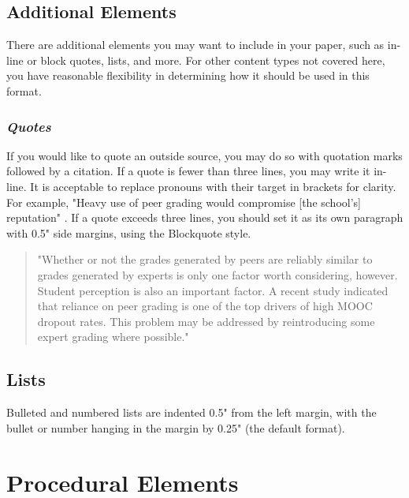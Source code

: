 \documentclass[11pt,a4paper,usenames,dvipsnames]{article}
\begin{document}
\subsection{Additional Elements}
There are additional elements you may want to include in your paper, such as in-line or block quotes, lists, and more. For other content types not covered here, you have reasonable flexibility in determining how it should be used in this format.

\subsubsection{\textit{Quotes}}
If you would like to quote an outside source, you may do so with quotation marks followed by a citation. If a quote is fewer than three lines, you may write it in-line. It is acceptable to replace pronouns with their target in brackets for clarity. For example, "Heavy use of peer grading would compromise [the school’s] reputation" \parencite{joyner2016}. If a quote exceeds three lines, you should set it as its own paragraph with 0.5" side margins, using the Blockquote style.
\begin{quote}
"Whether or not the grades generated by peers are reliably similar to grades generated by experts is only one factor worth considering, however. Student perception is also an important factor. A recent study indicated that reliance on peer grading is one of the top drivers of high MOOC dropout rates. This problem may be addressed by reintroducing some expert grading where possible." \parencite{joyner2016}

\end{quote}

\subsection{Lists}
Bulleted and numbered lists are indented 0.5" from the left margin, with the bullet or number hanging in the margin by 0.25" (the default format).

\section{Procedural Elements}
\end{document}
